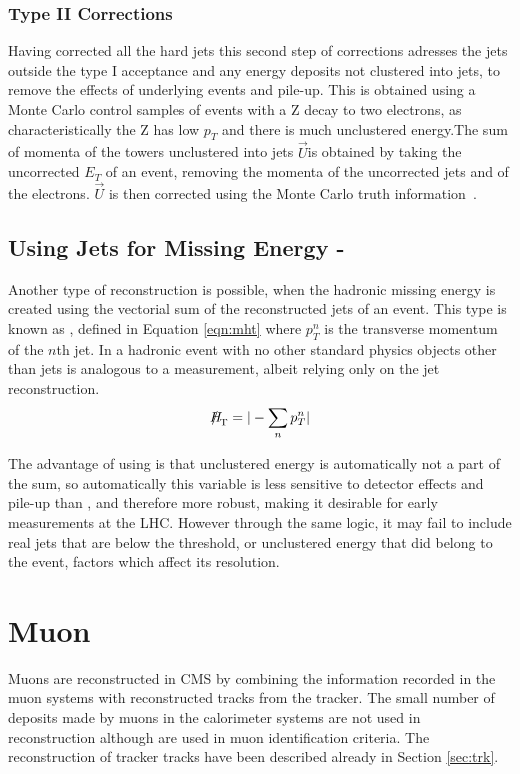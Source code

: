 \subsubsection{Type II Corrections}

Having corrected all the hard jets this second step of corrections adresses the jets outside the type I acceptance and any energy deposits not clustered into jets, to remove the effects of underlying events and pile-up. This is obtained using a Monte Carlo control samples of events with a Z decay to two electrons, as characteristically the Z has low $p_{T}$ and there is much unclustered energy.The sum of momenta of the towers unclustered into jets $\vec{U}$is obtained by taking the uncorrected $E_{T}$ of an event, removing the momenta of the uncorrected jets and of the electrons. $\vec{U}$ is then corrected using the Monte Carlo truth information~\cite{JME-10-004}. 


\subsection{Using Jets for Missing Energy - \MHT}

Another type of \met reconstruction is possible, when the hadronic missing energy is created using the vectorial sum of the reconstructed jets of an event. This type is known as \MHT, defined in Equation \ref{eqn:mht} where $p_{T}^{n}$ is the transverse momentum of the $n$th jet.  In a hadronic event with no other standard physics objects other than jets is analogous to a \met measurement, albeit relying only on the jet reconstruction. 
\begin{equation}
\MHT = | - \sum_{n} p_{T}^{n}|
\label{eqn:mht}
\end{equation}

The advantage of using \MHT is that unclustered energy is automatically not a part of the sum, so automatically this variable is less sensitive to detector effects and pile-up than \met, and therefore more robust, making it desirable for early measurements at the LHC. However through the same logic, it may fail to include real jets that are below the threshold, or unclustered energy that did belong to the event, factors which affect its resolution. 

\section{Muon}
\label{sec:muon}
Muons are reconstructed in CMS by combining the information recorded in the muon systems with reconstructed tracks from the tracker. The small number of deposits made by muons in the calorimeter systems are not used in reconstruction although are used in muon identification criteria. The reconstruction of tracker tracks have been described already in Section  \ref{sec:trk}. 


